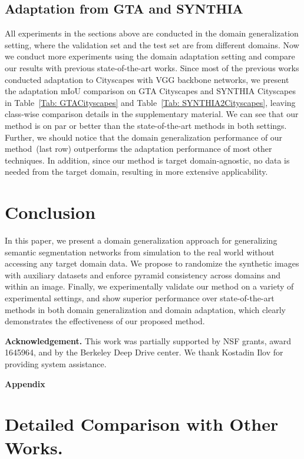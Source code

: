 \documentclass[10pt,twocolumn,letterpaper]{article}
\begin{document}
\subsection{Adaptation from GTA and SYNTHIA}
\label{subsec:adaptation}
All experiments in the sections above are conducted in the domain generalization setting, where the validation set and the test set are from different domains. Now we conduct more experiments using the domain adaptation setting and compare our results with previous state-of-the-art works. Since most of the previous works conducted adaptation to Cityscapes with VGG backbone networks, we present the adaptation mIoU comparison on GTA  Cityscapes  and SYNTHIA  Cityscapes in Table~\ref{Tab: GTACityscapes} and Table~\ref{Tab: SYNTHIA2Cityscapes}, leaving class-wise comparison details in the supplementary material. We can see that our method is on par or better than the state-of-the-art methods in both settings. Further, we should notice that the domain generalization performance of our method~(last row) outperforms the adaptation performance of most other techniques.  In addition, since our method is target domain-agnostic, no data is needed from the target domain, resulting in more extensive applicability. 


\section{Conclusion}
In this paper, we present a domain generalization approach for generalizing semantic segmentation networks from simulation to the real world without accessing any target domain data. We propose to randomize the synthetic images with auxiliary datasets and enforce pyramid consistency across domains and within an image. Finally, we experimentally validate our method on a variety of experimental settings, and show superior performance over state-of-the-art methods in both domain generalization and domain adaptation, which clearly demonstrates the effectiveness of our proposed method.

\textbf{Acknowledgement.} This work was partially supported by NSF grants, award 1645964, and by the Berkeley Deep Drive center. We thank Kostadin Ilov for providing system assistance.
{\small


}

\clearpage
\appendix
\noindent\textbf{\Large Appendix}
\section{Detailed Comparison with Other Works.}
\end{document}

